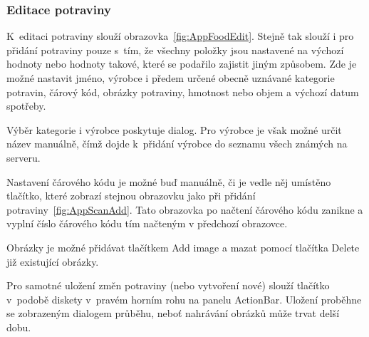 \documentclass[thesis=B,czech]{FITthesis}[2013/10/20]
\begin{document}
\clearpage

\subsubsection{Editace potraviny}

K~editaci potraviny slouží obrazovka~\ref{fig:AppFoodEdit}. Stejně tak slouží i pro přidání potraviny pouze s~tím, že všechny položky jsou nastavené na výchozí hodnoty nebo hodnoty takové, které se podařilo zajistit jiným způsobem. Zde je možné nastavit jméno, výrobce i předem určené obecně uznávané kategorie potravin, čárový kód, obrázky potraviny, hmotnost nebo objem a výchozí datum spotřeby.

Výběr kategorie i výrobce poskytuje dialog. Pro výrobce je však možné určit název manuálně, čímž dojde k~přidání výrobce do seznamu všech známých na serveru.

Nastavení čárového kódu je možné buď manuálně, či je vedle něj umístěno tlačítko, které zobrazí stejnou obrazovku jako při přidání potraviny~\ref{fig:AppScanAdd}. Tato obrazovka po načtení čárového kódu zanikne a vyplní číslo čárového kódu tím načteným v předchozí obrazovce.

Obrázky je možné přidávat tlačítkem Add image a mazat pomocí tlačítka Delete již existující obrázky.

Pro samotné uložení změn potraviny (nebo vytvoření nové) slouží tlačítko v~podobě diskety v~pravém horním rohu na panelu ActionBar. Uložení proběhne se zobrazeným dialogem průběhu, neboť nahrávání obrázků může trvat delší dobu.
\end{document}
